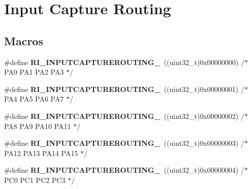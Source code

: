 \hypertarget{group___r_i___input_capture_routing}{\section{Input Capture Routing}
\label{group___r_i___input_capture_routing}
}
\subsection*{Macros}
\begin{DoxyCompactItemize}
\item 
\hypertarget{group___r_i___input_capture_routing_gafd5e6eeddaab86cb1d13c91ef37cbf79}{\#define {\bfseries R\-I\-\_\-\-I\-N\-P\-U\-T\-C\-A\-P\-T\-U\-R\-E\-R\-O\-U\-T\-I\-N\-G\-\_}~((uint32\-\_\-t)0x00000000) /$\ast$ P\-A0       P\-A1      P\-A2       P\-A3      $\ast$/}\label{group___r_i___input_capture_routing_gafd5e6eeddaab86cb1d13c91ef37cbf79}

\item 
\hypertarget{group___r_i___input_capture_routing_ga558a965c269bd07a59f8169f2a11e091}{\#define {\bfseries R\-I\-\_\-\-I\-N\-P\-U\-T\-C\-A\-P\-T\-U\-R\-E\-R\-O\-U\-T\-I\-N\-G\-\_}~((uint32\-\_\-t)0x00000001) /$\ast$ P\-A4       P\-A5      P\-A6       P\-A7      $\ast$/}\label{group___r_i___input_capture_routing_ga558a965c269bd07a59f8169f2a11e091}

\item 
\hypertarget{group___r_i___input_capture_routing_gadfd6d9659b7193d113a15949387705b3}{\#define {\bfseries R\-I\-\_\-\-I\-N\-P\-U\-T\-C\-A\-P\-T\-U\-R\-E\-R\-O\-U\-T\-I\-N\-G\-\_}~((uint32\-\_\-t)0x00000002) /$\ast$ P\-A8       P\-A9      P\-A10      P\-A11     $\ast$/}\label{group___r_i___input_capture_routing_gadfd6d9659b7193d113a15949387705b3}

\item 
\hypertarget{group___r_i___input_capture_routing_gaa3d87f14b718cdb5c833b6beb1e3c823}{\#define {\bfseries R\-I\-\_\-\-I\-N\-P\-U\-T\-C\-A\-P\-T\-U\-R\-E\-R\-O\-U\-T\-I\-N\-G\-\_}~((uint32\-\_\-t)0x00000003) /$\ast$ P\-A12      P\-A13     P\-A14      P\-A15     $\ast$/}\label{group___r_i___input_capture_routing_gaa3d87f14b718cdb5c833b6beb1e3c823}

\item 
\hypertarget{group___r_i___input_capture_routing_ga39646a1f0d212d8a5e0d7ad5c6a80b73}{\#define {\bfseries R\-I\-\_\-\-I\-N\-P\-U\-T\-C\-A\-P\-T\-U\-R\-E\-R\-O\-U\-T\-I\-N\-G\-\_}~((uint32\-\_\-t)0x00000004) /$\ast$ P\-C0       P\-C1      P\-C2       P\-C3      $\ast$/}\label{group___r_i___input_capture_routing_ga39646a1f0d212d8a5e0d7ad5c6a80b73}


\end{DoxyCompactItemize}
